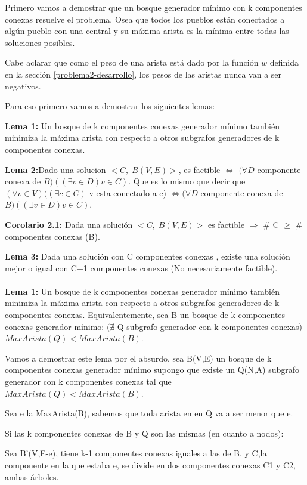Primero vamos a demostrar que un bosque generador mínimo con k componentes conexas resuelve el problema. Osea que todos los pueblos están conectados a algún pueblo con una central y su máxima arista es la mínima entre todas las soluciones posibles.

Cabe aclarar que como el peso de una arista está dado por la función $w$ definida en la sección \ref{problema2-desarrollo}, los pesos de las aristas nunca van a ser negativos.

Para eso primero vamos a demostrar los siguientes lemas:

\textbf{Lema 1:} Un bosque de k componentes conexas generador mínimo también minimiza la máxima arista con respecto a otros subgrafos generadores de k componentes conexas.

\textbf{Lema 2:}Dado una solucion  $<C,\;B(V,E)>$, es factible $\Longleftrightarrow$ $(\forall D$ componente conexa de $B)((\exists v \in D) v \in C)$. Que es lo mismo que decir que $(\forall v \in V)((\exists c \in C)$ v esta conectado a c) $\Leftrightarrow (\forall D$ componente conexa de $B)((\exists v \in D) v \in C)$.

\textbf{Corolario 2.1:} Dada una solución $<C,\;B(V,E)>$ es factible $\Rightarrow$ \# C $\geq$ \# componentes conexas (B).

\textbf{Lema 3:} Dada una solución con C componentes conexas , existe una solución mejor o igual con C+1 componentes conexas (No necesariamente factible). \\ \\ 


\textbf{Lema 1:} Un bosque de k componentes conexas generador mínimo también minimiza la máxima arista con respecto a otros subgrafos generadores de k componentes conexas. Equivalentemente, sea B un bosque de k componentes conexas generador mínimo: $(\nexists$ Q subgrafo generador con k componentes conexas) $MaxArista(Q) < MaxArista(B)$.

Vamos a demostrar este lema por el absurdo, sea B(V,E) un bosque de k componentes conexas generador mínimo supongo que existe un Q(N,A) subgrafo generador con k componentes conexas tal que $MaxArista(Q) < MaxArista(B)$.

Sea e la MaxArista(B), sabemos que toda arista en en Q va a ser menor que e.

Si las k componentes conexas de B y Q son las mismas (en cuanto a nodos):

Sea B'(V,E-e), tiene k-1 componentes conexas iguales a las de B, y C,la componente en la que estaba e, se divide en dos componentes conexas C1 y C2, ambas árboles.

